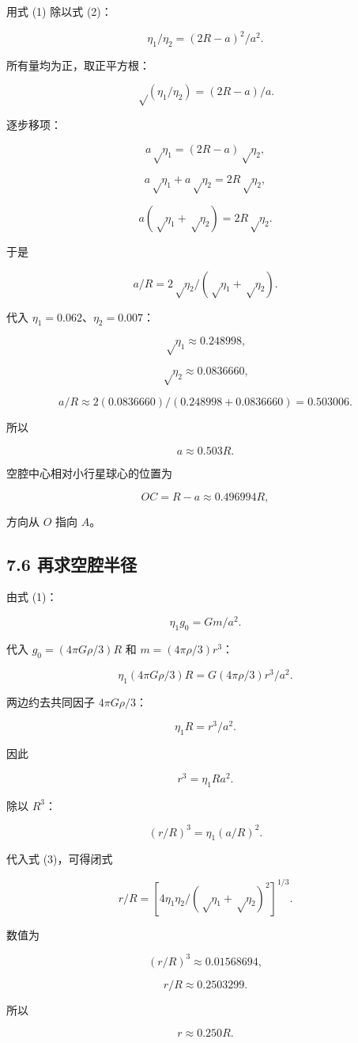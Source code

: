 \documentclass[
  11pt,
  UTF8]{ctexart}
\begin{document}
用式 (1) 除以式 (2)：

\[η_1/η_2=(2R-a)^2/a^2.\]

所有量均为正，取正平方根：

\[√(η_1/η_2)=(2R-a)/a.\]

逐步移项：

\[a√η_1=(2R-a)√η_2,\]

\[a√η_1+a√η_2=2R√η_2,\]

\[a(√η_1+√η_2)=2R√η_2.\]

于是

\[a/R=2√η_2/(√η_1+√η_2). \tag{3}\]

代入 \(η_1=0.062\)、\(η_2=0.007\)：

\[√η_1≈0.248998,\]

\[√η_2≈0.0836660,\]

\[a/R≈2(0.0836660)/(0.248998+0.0836660)=0.503006.\]

所以

\[a≈0.503R.\]

空腔中心相对小行星球心的位置为

\[OC=R-a≈0.496994R,\]

方向从 \(O\) 指向 \(A\)。

\hypertarget{ux518dux6c42ux7a7aux8154ux534aux5f84}{%
\subsection{7.6
再求空腔半径}\label{ux518dux6c42ux7a7aux8154ux534aux5f84}}

由式 (1)：

\[η_1g_0=Gm/a^2.\]

代入 \(g_0=(4πGρ/3)R\) 和 \(m=(4πρ/3)r^3\)：

\[η_1(4πGρ/3)R=G(4πρ/3)r^3/a^2.\]

两边约去共同因子 \(4πGρ/3\)：

\[η_1R=r^3/a^2.\]

因此

\[r^3=η_1Ra^2.\]

除以 \(R^3\)：

\[(r/R)^3=η_1(a/R)^2.\]

代入式 (3)，可得闭式

\[r/R=[4η_1η_2/(√η_1+√η_2)^2]^{1/3}. \tag{4}\]

数值为

\[(r/R)^3≈0.01568694,\]

\[r/R≈0.2503299.\]

所以

\[r≈0.250R.\]
\end{document}
